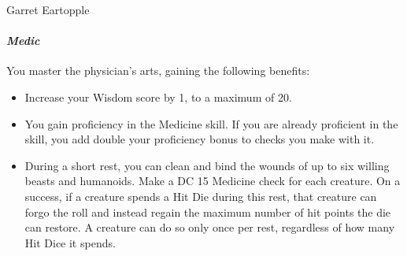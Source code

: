 \documentclass[10pt,twoside,twocolumn]{book}
\begin{document}
\begin{rpg-monsterbox}{Garret Eartopple}
   \paragraph{\emph{Medic}}
   You master the physician's arts, gaining the following benefits:
   \begin{itemize}
      \item Increase your Wisdom score by 1, to a maximum of 20.
      \item You gain proficiency in the Medicine skill. If you are already proficient in the skill, you add double your proficiency bonus to checks you make with it.
      \item During a short rest, you can clean and bind the wounds of up to six willing beasts and humanoids. Make a DC 15 Medicine check for each creature. On a success, if a creature spends a Hit Die during this rest, that creature can forgo the roll and instead regain the maximum number of hit points the die can restore. A creature can do so only once per rest, regardless of how many Hit Dice it spends.
   \end{itemize}

\end{rpg-monsterbox}
\end{document}
